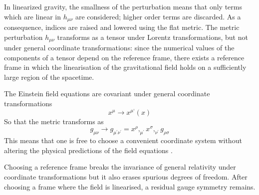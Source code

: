 \documentclass[binding=0.6cm, LaM]{sapthesis}
\begin{document}
	In linearized gravity, the smallness of the perturbation means that only terms which are linear in $h_{\mu\nu}$ are considered;
	higher order terms are discarded. As a consequence, indices are raised and lowered using the flat metric. 
	The metric perturbation $h_{\mu\nu}$ transforms as a tensor under Lorentz transformations, 
	but not under general coordinate transformations: since the numerical values of the components
	of a tensor depend on the reference frame, there exists a reference frame in which 
	the linearisation of the gravitational field holds on a sufficiently large region of the spacetime.

	The Einstein field equations are covariant under general coordinate transformations
		\begin{equation}
		x^{\mu} \rightarrow x^{\mu ‘}(x)
		\end{equation}
	So that the metric transforms as
		\begin{equation}
		g_{\mu\nu} \rightarrow g_{\mu^\prime\nu^\prime} = x^{\rho},_{\mu^\prime}x^{\sigma},_{\nu^\prime}g_{\rho \sigma}
		\end{equation}
	This means that one is free to choose a convenient coordinate system without 
	altering the physical predictions of the field equations \cite{16}.

	Choosing a reference frame breaks the invariance of general relativity under 
	coordinate transformations but it also erases spurious degrees of freedom. 
	After choosing a frame where the field is linearised, 
	a residual gauge symmetry remains.
\end{document}
